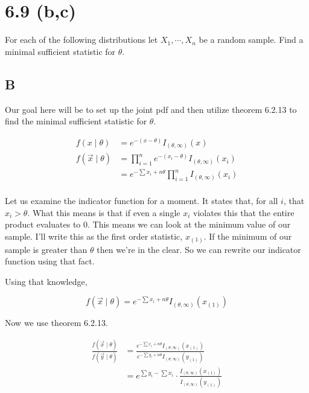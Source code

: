 \section*{6.9 (b,c)}

For each of the following distributions let $X_1, \cdots, X_n$ be a random sample. Find a minimal sufficient statistic for $\theta$. 

\subsection*{B}

Our goal here will be to set up the joint pdf and then utilize theorem 6.2.13 to find the minimal sufficient statistic for $\theta$. 

\vspace{-5mm}
\begin{align*}
	f(x \mid \theta) &= e^{-(x-\theta)} I_{(\theta, \infty)}(x) \\
	f(\vec{x} \mid \theta) &= \prod_{i=1}^n e^{-(x_i-\theta)} I_{(\theta, \infty)}(x_i) \\
	&= e^{-\sum x_i + n\theta} \prod_{i=1}^n  I_{(\theta, \infty)}(x_i) \\
\end{align*}
\vspace{-10mm}

Let us examine the indicator function for a moment. It states that, for all $i$, that $x_i > \theta$. What this means is that if even a single $x_i$ violates this that the entire product evaluates to 0. This means we can look at the minimum value of our sample. I'll write this as the first order statistic, $x_{(1)}$. If the minimum of our sample is greater than $\theta$ then we're in the clear. So we can rewrite our indicator function using that fact.

Using that knowledge,

\[f(\vec{x} \mid \theta) = e^{-\sum x_i + n\theta} I_{(\theta, \infty)}(x_{(1)})\]

Now we use theorem 6.2.13.

\begin{align*}
	\frac{f(\vec{x} \mid \theta)}{f(\vec{y} \mid \theta) } &= \frac{ e^{-\sum x_i + n\theta} I_{(\theta, \infty)}(x_{(1)})}{ e^{-\sum y_i + n\theta} I_{(\theta, \infty)}(y_{(1)})} \\
	&= e^{\sum y_i - \sum x_i} \cdot \frac{I_{(\theta, \infty)}(x_{(1)})}{I_{(\theta, \infty)}(y_{(1)})}
\end{align*}

